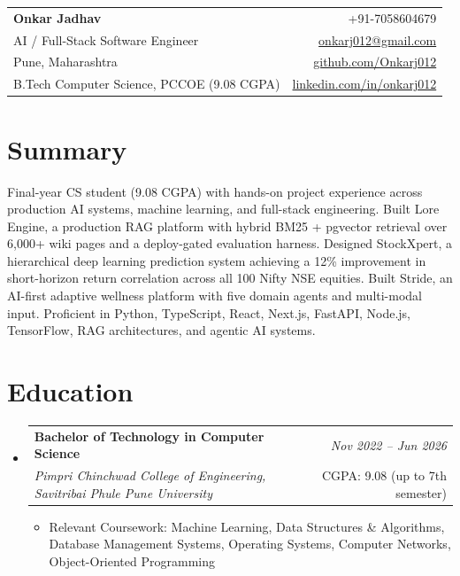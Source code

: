 \documentclass[a4paper,11pt]{article}
\makeatletter
\newcommand{\resumeSubheading}[4]{
\vspace{0.5mm}\item
    \begin{tabular*}{0.98\textwidth}[t]{l@{\extracolsep{\fill}}r}
        \textbf{#1} & \textit{\footnotesize{#4}} \\
        \textit{\footnotesize{#3}} & \footnotesize{#2}\\
    \end{tabular*}
    \vspace{-2.4mm}
}
\newcommand{\resumeSubHeadingListStart}{\begin{itemize}[leftmargin=*,labelsep=0mm]}
\newcommand{\resumeItemListStart}{\begin{justify}\begin{itemize}[leftmargin=3ex, rightmargin=2ex, noitemsep,labelsep=1.2mm,itemsep=0mm]\footnotesize}
\newcommand{\resumeSubHeadingListEnd}{\end{itemize}\vspace{2mm}}
\newcommand{\resumeItemListEnd}{\end{itemize}\end{justify}\vspace{-2mm}}
\newcommand{\name}{Onkar Jadhav}
\newcommand{\phone}{7058604679}
\newcommand{\emaila}{onkarj012@gmail.com}
\newcommand{\github}{github.com/Onkarj012}
\newcommand{\linkedin}{linkedin.com/in/onkarj012}
\makeatother
\begin{document}
\begin{tabularx}{\linewidth}{L r}
  \textbf{\Large \name} & {+91-\phone} \\
  {AI / Full-Stack Software Engineer} & \href{mailto:\emaila}{\emaila} \\
  {Pune, Maharashtra} & \href{https://\github}{\github} \\
  {B.Tech Computer Science, PCCOE (9.08 CGPA)} & \href{https://\linkedin}{\linkedin}
\end{tabularx}
\vspace{-4mm}

\section{\textbf{Summary}}
\vspace{1mm}
\small{
Final-year CS student (9.08 CGPA) with hands-on project experience across production AI systems, machine learning, and full-stack engineering. Built Lore Engine, a production RAG platform with hybrid BM25 + pgvector retrieval over 6,000+ wiki pages and a deploy-gated evaluation harness. Designed StockXpert, a hierarchical deep learning prediction system achieving a 12\% improvement in short-horizon return correlation across all 100 Nifty NSE equities. Built Stride, an AI-first adaptive wellness platform with five domain agents and multi-modal input. Proficient in Python, TypeScript, React, Next.js, FastAPI, Node.js, TensorFlow, RAG architectures, and agentic AI systems.
}
\vspace{-3mm}

\section{\textbf{Education}}
  \resumeSubHeadingListStart
    \resumeSubheading
      {Bachelor of Technology in Computer Science}{CGPA: 9.08 (up to 7th semester)}
      {Pimpri Chinchwad College of Engineering, Savitribai Phule Pune University}{Nov 2022 -- Jun 2026}
      \resumeItemListStart
        \item {Relevant Coursework: Machine Learning, Data Structures \& Algorithms, Database Management Systems, Operating Systems, Computer Networks, Object-Oriented Programming}
      \resumeItemListEnd
  \resumeSubHeadingListEnd
\vspace{-5.5mm}

\end{document}
